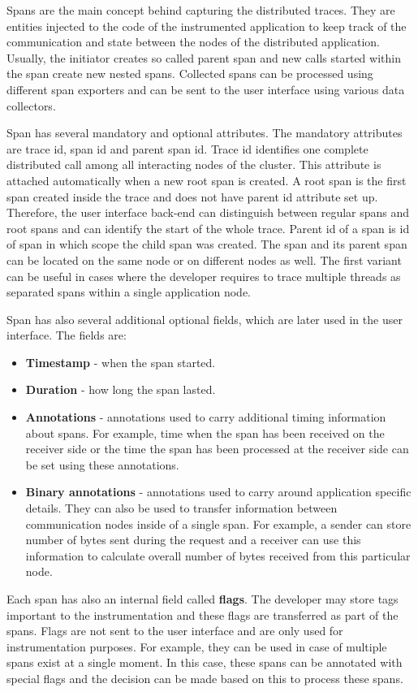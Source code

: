 Spans are the main concept behind capturing the distributed traces. They are entities injected to the code of the instrumented application to keep track of the communication and state between the nodes of the distributed application. Usually, the initiator creates so called parent span and new calls started within the span create new nested spans. Collected spans can be processed using different span exporters and can be sent to the user interface using various data collectors.

Span has several mandatory and optional attributes. The mandatory attributes are trace id, span id and parent span id. Trace id identifies one complete distributed call among all interacting nodes of the cluster. This attribute is attached automatically when a new root span is created. A root span is the first span created inside the trace and does not have parent id attribute set up. Therefore, the user interface back-end can distinguish between regular spans and root spans and can identify the start of the whole trace. Parent id of a span is id of span in which scope the child span was created. The span and its parent span can be located on the same node or on different nodes as well. The first variant can be useful in cases where the developer requires to trace multiple threads as separated spans within a single application node.  

Span has also several additional optional fields, which are later used in the user interface. The fields are:
\begin{itemize}
	\item \textbf{Timestamp} - when the span started.
	\item \textbf{Duration} - how long the span lasted.
	\item \textbf{Annotations} - annotations used to carry additional timing information about spans. For example, time when the span has been received on the receiver side or the time the span has been processed at the receiver side can be set using these annotations.
	\item \textbf{Binary annotations} - annotations used to carry around application specific details. They can also be used to transfer information between communication nodes inside of a single span. For example, a sender can store number of bytes sent during the request and a receiver can use this information to calculate overall number of bytes received from this particular node.
\end{itemize}
Each span has also an internal field called \textbf{flags}. The developer may store tags important to the instrumentation and these flags are transferred as part of the spans. Flags are not sent to the user interface and are only used for instrumentation purposes. For example, they can be used in case of multiple spans exist at a single moment. In this case, these spans can be annotated with special flags and the decision can be made based on this to process these spans.

